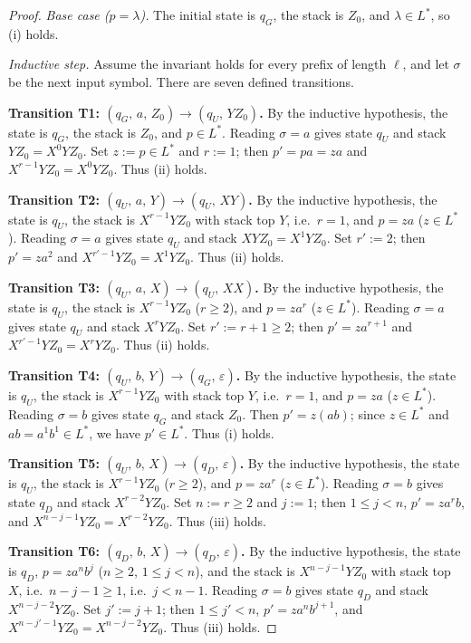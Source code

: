 \documentclass[11pt,a4paper]{article}
\begin{document}
\begin{proof}
\emph{Base case ($p=\lambda$).}
The initial state is $q_G$, the stack is $Z_0$, and $\lambda\in L^*$,
so \textup{(i)} holds.

\emph{Inductive step.}
Assume the invariant holds for every prefix of length $\ell$, and let
$\sigma$ be the next input symbol.
There are seven defined transitions.

\smallskip
\noindent\textbf{Transition T1: $(q_G,\,a,\,Z_0)\to(q_U,\,YZ_0)$.}
By the inductive hypothesis, the state is $q_G$, the stack is $Z_0$,
and $p\in L^*$.
Reading $\sigma=a$ gives state $q_U$ and stack $YZ_0=X^0YZ_0$.
Set $z:=p\in L^*$ and $r:=1$; then $p'=pa=za$ and
$X^{r-1}YZ_0=X^0YZ_0$.
Thus \textup{(ii)} holds.

\smallskip
\noindent\textbf{Transition T2: $(q_U,\,a,\,Y)\to(q_U,\,XY)$.}
By the inductive hypothesis, the state is $q_U$, the stack is
$X^{r-1}YZ_0$ with stack top $Y$, i.e.\ $r=1$, and $p=za$
($z\in L^*$).
Reading $\sigma=a$ gives state $q_U$ and stack $XYZ_0=X^1YZ_0$.
Set $r':=2$; then $p'=za^2$ and $X^{r'-1}YZ_0=X^1YZ_0$.
Thus \textup{(ii)} holds.

\smallskip
\noindent\textbf{Transition T3: $(q_U,\,a,\,X)\to(q_U,\,XX)$.}
By the inductive hypothesis, the state is $q_U$, the stack is
$X^{r-1}YZ_0$ ($r\ge 2$), and $p=za^r$ ($z\in L^*$).
Reading $\sigma=a$ gives state $q_U$ and stack $X^rYZ_0$.
Set $r':=r+1\ge 2$; then $p'=za^{r+1}$ and $X^{r'-1}YZ_0=X^rYZ_0$.
Thus \textup{(ii)} holds.

\smallskip
\noindent\textbf{Transition T4: $(q_U,\,b,\,Y)\to(q_G,\,\varepsilon)$.}
By the inductive hypothesis, the state is $q_U$, the stack is
$X^{r-1}YZ_0$ with stack top $Y$, i.e.\ $r=1$, and $p=za$
($z\in L^*$).
Reading $\sigma=b$ gives state $q_G$ and stack $Z_0$.
Then $p'=z(ab)$; since $z\in L^*$ and $ab=a^1b^1\in L^*$, we have
$p'\in L^*$.
Thus \textup{(i)} holds.

\smallskip
\noindent\textbf{Transition T5: $(q_U,\,b,\,X)\to(q_D,\,\varepsilon)$.}
By the inductive hypothesis, the state is $q_U$, the stack is
$X^{r-1}YZ_0$ ($r\ge 2$), and $p=za^r$ ($z\in L^*$).
Reading $\sigma=b$ gives state $q_D$ and stack $X^{r-2}YZ_0$.
Set $n:=r\ge 2$ and $j:=1$; then $1\le j<n$, $p'=za^rb$, and
$X^{n-j-1}YZ_0=X^{r-2}YZ_0$.
Thus \textup{(iii)} holds.

\smallskip
\noindent\textbf{Transition T6: $(q_D,\,b,\,X)\to(q_D,\,\varepsilon)$.}
By the inductive hypothesis, the state is $q_D$, $p=za^nb^j$
($n\ge 2$, $1\le j<n$), and the stack is $X^{n-j-1}YZ_0$ with stack
top $X$, i.e.\ $n-j-1\ge 1$, i.e.\ $j<n-1$.
Reading $\sigma=b$ gives state $q_D$ and stack $X^{n-j-2}YZ_0$.
Set $j':=j+1$; then $1\le j'<n$, $p'=za^nb^{j+1}$, and
$X^{n-j'-1}YZ_0=X^{n-j-2}YZ_0$.
Thus \textup{(iii)} holds.


\end{proof}
\end{document}
